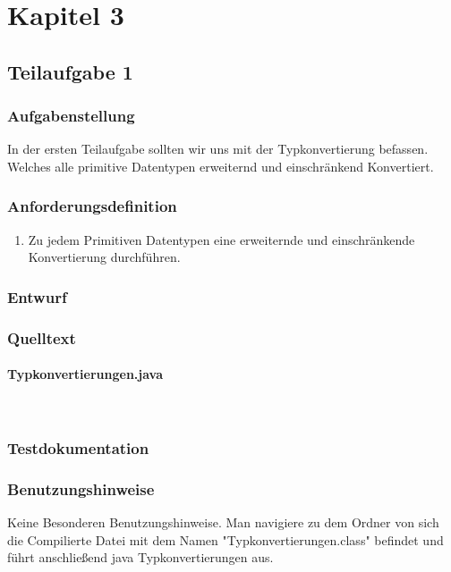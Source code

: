 \section{Kapitel 3}
\subsection{Teilaufgabe 1}
\subsubsection{Aufgabenstellung}
In der ersten Teilaufgabe sollten wir uns mit der Typkonvertierung befassen. Welches alle
primitive Datentypen erweiternd und einschränkend Konvertiert.

\subsubsection{Anforderungsdefinition}
\begin{enumerate}
	\item Zu jedem Primitiven Datentypen eine erweiternde und einschränkende Konvertierung
	durchführen.
\end{enumerate}

\subsubsection{Entwurf}


\subsubsection{Quelltext}
\paragraph{Typkonvertierungen.java}\


\subsubsection{Testdokumentation}

\subsubsection{Benutzungshinweise}
Keine Besonderen Benutzungshinweise.
Man navigiere zu dem Ordner von sich die Compilierte Datei mit dem Namen "Typkonvertierungen.class"
\space befindet und führt anschlie\ss end java Typkonvertierungen aus.

